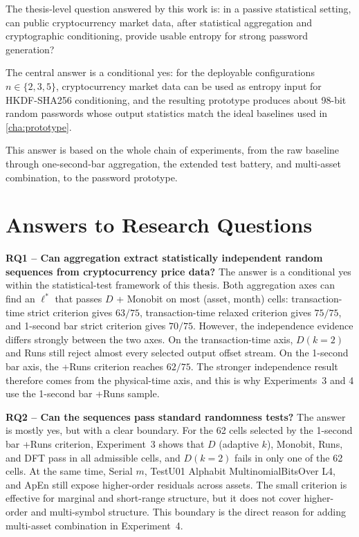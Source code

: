 \documentclass[11pt,titlepage,openany,oneside]{book}  %
\begin{document}
The thesis-level question answered by this work is: in a passive statistical setting, can public cryptocurrency market data, after statistical aggregation and cryptographic conditioning, provide usable entropy for strong password generation?

The central answer is a conditional yes: for the deployable configurations $n \in \{2,3,5\}$, cryptocurrency market data can be used as entropy input for HKDF-SHA256 conditioning, and the resulting prototype produces about 98-bit random passwords whose output statistics match the ideal baselines used in \cref{cha:prototype}.

This answer is based on the whole chain of experiments, from the raw baseline through one-second-bar aggregation, the extended test battery, and multi-asset combination, to the password prototype.

\section{Answers to Research Questions}
\label{sec:answers-rq}

\textbf{RQ1 -- Can aggregation extract statistically independent random sequences from cryptocurrency price data?} The answer is a conditional yes within the statistical-test framework of this thesis. Both aggregation axes can find an $\ell^*$ that passes $D$ + Monobit on most (asset, month) cells: transaction-time strict criterion gives $63/75$, transaction-time relaxed criterion gives $75/75$, and 1-second bar strict criterion gives $70/75$. However, the independence evidence differs strongly between the two axes. On the transaction-time axis, $D(k=2)$ and Runs still reject almost every selected output offset stream. On the 1-second bar axis, the +Runs criterion reaches $62/75$. The stronger independence result therefore comes from the physical-time axis, and this is why Experiments~3 and 4 use the 1-second bar +Runs sample.

\textbf{RQ2 -- Can the sequences pass standard randomness tests?} The answer is mostly yes, but with a clear boundary. For the 62 cells selected by the 1-second bar +Runs criterion, Experiment~3 shows that $D$ (adaptive $k$), Monobit, Runs, and DFT pass in all admissible cells, and $D(k=2)$ fails in only one of the 62 cells. At the same time, Serial $m$, TestU01 Alphabit MultinomialBitsOver L4, and ApEn still expose higher-order residuals across assets. The small criterion is effective for marginal and short-range structure, but it does not cover higher-order and multi-symbol structure. This boundary is the direct reason for adding multi-asset combination in Experiment~4.
\end{document}
